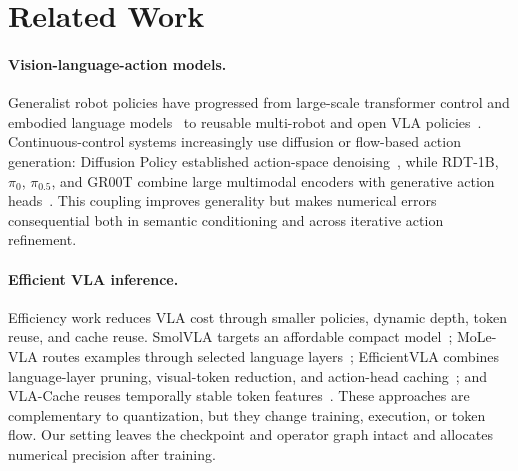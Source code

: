 \section{Related Work}
\label{sec:related}

\paragraph{Vision-language-action models.}
Generalist robot policies have progressed from large-scale transformer control and embodied language models~\cite{brohan2023rt1,driess2023palme,brohan2023rt2} to reusable multi-robot and open VLA policies~\cite{octo2024,kim2024openvla}. Continuous-control systems increasingly use diffusion or flow-based action generation: Diffusion Policy established action-space denoising~\cite{chi2023diffusionpolicy}, while RDT-1B, $\pi_0$, $\pi_{0.5}$, and GR00T combine large multimodal encoders with generative action heads~\cite{liu2025rdt1b,black2024pi0,intelligence2025pi05,bjorck2025groot}. This coupling improves generality but makes numerical errors consequential both in semantic conditioning and across iterative action refinement.

\paragraph{Efficient VLA inference.}
Efficiency work reduces VLA cost through smaller policies, dynamic depth, token reuse, and cache reuse. SmolVLA targets an affordable compact model~\cite{shukor2025smolvla}; MoLe-VLA routes examples through selected language layers~\cite{zhang2025molevla}; EfficientVLA combines language-layer pruning, visual-token reduction, and action-head caching~\cite{yang2025efficientvla}; and VLA-Cache reuses temporally stable token features~\cite{xu2025vlacache}. These approaches are complementary to quantization, but they change training, execution, or token flow. Our setting leaves the checkpoint and operator graph intact and allocates numerical precision after training.


